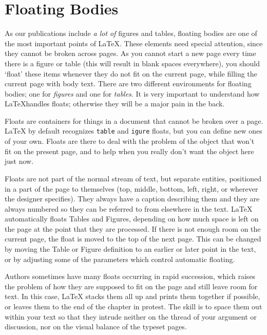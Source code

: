 \documentclass[10pt, a4paper]{article}
\begin{document}
\section{Floating Bodies}
As our publications include \emph{a lot of} figures and tables, floating bodies are one of the most important points of \LaTeX. These elements need special attention, since they cannot be broken across pages. As you cannot start a new page every time there is a figure or table (this will result in blank spaces everywhere), you should `float' these items whenever they do not fit on the current page, while filling the current page with body text. There are two different environments for floating bodies; one for \textsl{figures} and one for \textsl{tables}. It is very important to understand how \LaTeX handles floats; otherwise they will be a major pain in the back. 

Floats are containers for things in a document that cannot be broken over a page. \LaTeX{} by default recognizes \texttt{table} and \texttt{igure} floats, but you can define new ones of your own. Floats are there to deal with the problem of the object that won't fit on the present page, and to help when you really don't want the object here just now.

Floats are not part of the normal stream of text, but separate entities, positioned in a part of the page to themselves (top, middle, bottom, left, right, or wherever the designer specifies). They always have a caption describing them and they are always numbered so they can be referred to from elsewhere in the text. \LaTeX{} automatically floats Tables and Figures, depending on how much space is left on the page at the point that they are processed. If there is not enough room on the current page, the float is moved to the top of the next page. This can be changed by moving the Table or Figure definition to an earlier or later point in the text, or by adjusting some of the parameters which control automatic floating.

Authors sometimes have many floats occurring in rapid succession, which raises the problem of how they are supposed to fit on the page and still leave room for text. In this case, \LaTeX{} stacks them all up and prints them together if possible, or leaves them to the end of the chapter in protest. The skill is to space them out within your text so that they intrude neither on the thread of your argument or discussion, nor on the visual balance of the typeset pages.
\end{document}
